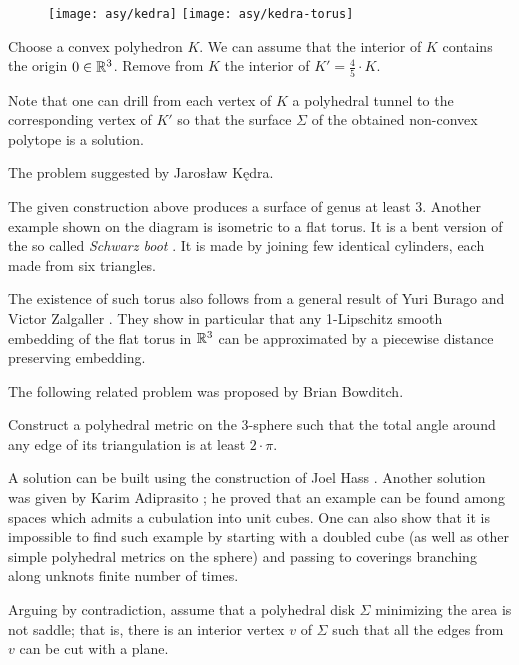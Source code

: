 {

\begin{wrapfigure}{r}{43 mm}
\vskip-4mm
\centering
\texttt{[image: asy/kedra]}
\bigskip
\texttt{[image: asy/kedra-torus]}
\end{wrapfigure}

\medskip

Choose a convex polyhedron $K$.
We can assume that the interior of $K$ contains the origin $0\in\mathbb{R}^3$.
Remove from $K$ the interior of $K'=\tfrac45\cdot K$.

Note that one can drill from each vertex of $K$ a polyhedral tunnel to the corresponding vertex of $K'$
so that the surface $\Sigma$ of the obtained non-convex polytope is a solution.
\qeds

The problem suggested by Jaros{\l}aw K\k{e}dra.

The given construction above produces a surface of genus at least 3.
Another example shown on the diagram is isometric to a flat torus.
It is a bent version of the so called \emph{Schwarz boot} \cite{schwarz1890definition}.
It is made by joining few identical cylinders, each made from six triangles.

}

The existence of such torus also follows from a general result of Yuri Burago and Victor Zalgaller \cite{burago-zalgaller:pl}.
They show in particular that any 1-Lipschitz smooth embedding of the flat torus in $\mathbb{R}^3$ can be approximated by a piecewise distance preserving embedding.

The following related problem was proposed by Brian Bowditch.

\begin{pr}
Construct a polyhedral metric on the 3-sphere such that the total angle around any edge of its triangulation is at least $2\cdot\pi$.
\end{pr}

A solution can be built using the construction of Joel Hass \cite{hass}.
Another solution was given by Karim Adiprasito \cite{adiprasito};
he proved that an example can be found among spaces which admits a cubulation into unit cubes.
One can also show that it is impossible to find such example by starting with a doubled cube (as well as other simple polyhedral metrics on the sphere) and passing to coverings branching along unknots finite number of times.


Arguing by contradiction, 
assume that a polyhedral disk $\Sigma$ minimizing the area is not saddle;
that is, there is an interior vertex $v$ of $\Sigma$ such that all the edges from $v$ can be cut with a plane.

